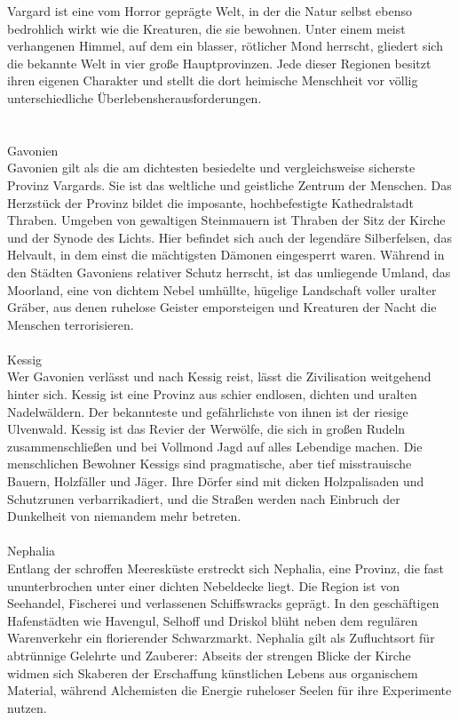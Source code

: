 \documentclass{book}
\begin{document}
Vargard ist eine vom Horror geprägte Welt, in der die Natur selbst ebenso bedrohlich wirkt wie die Kreaturen, die sie bewohnen. Unter einem meist verhangenen Himmel, auf dem ein blasser, rötlicher Mond herrscht, gliedert sich die bekannte Welt in vier große Hauptprovinzen. Jede dieser Regionen besitzt ihren eigenen Charakter und stellt die dort heimische Menschheit vor völlig unterschiedliche Überlebensherausforderungen.\\
\\\\
Gavonien\\
Gavonien gilt als die am dichtesten besiedelte und vergleichsweise sicherste Provinz Vargards. Sie ist das weltliche und geistliche Zentrum der Menschen. Das Herzstück der Provinz bildet die imposante, hochbefestigte Kathedralstadt Thraben. Umgeben von gewaltigen Steinmauern ist Thraben der Sitz der Kirche und der Synode des Lichts. Hier befindet sich auch der legendäre Silberfelsen, das Helvault, in dem einst die mächtigsten Dämonen eingesperrt waren. Während in den Städten Gavoniens relativer Schutz herrscht, ist das umliegende Umland, das Moorland, eine von dichtem Nebel umhüllte, hügelige Landschaft voller uralter Gräber, aus denen ruhelose Geister emporsteigen und Kreaturen der Nacht die Menschen terrorisieren.\\
\\
Kessig\\
Wer Gavonien verlässt und nach Kessig reist, lässt die Zivilisation weitgehend hinter sich. Kessig ist eine Provinz aus schier endlosen, dichten und uralten Nadelwäldern. Der bekannteste und gefährlichste von ihnen ist der riesige Ulvenwald. Kessig ist das Revier der Werwölfe, die sich in großen Rudeln zusammenschließen und bei Vollmond Jagd auf alles Lebendige machen. Die menschlichen Bewohner Kessigs sind pragmatische, aber tief misstrauische Bauern, Holzfäller und Jäger. Ihre Dörfer sind mit dicken Holzpalisaden und Schutzrunen verbarrikadiert, und die Straßen werden nach Einbruch der Dunkelheit von niemandem mehr betreten.\\
\\
Nephalia\\
Entlang der schroffen Meeresküste erstreckt sich Nephalia, eine Provinz, die fast ununterbrochen unter einer dichten Nebeldecke liegt. Die Region ist von Seehandel, Fischerei und verlassenen Schiffswracks geprägt. In den geschäftigen Hafenstädten wie Havengul, Selhoff und Driskol blüht neben dem regulären Warenverkehr ein florierender Schwarzmarkt. Nephalia gilt als Zufluchtsort für abtrünnige Gelehrte und Zauberer: Abseits der strengen Blicke der Kirche widmen sich Skaberen der Erschaffung künstlichen Lebens aus organischem Material, während Alchemisten die Energie ruheloser Seelen für ihre Experimente nutzen.\\
\end{document}
